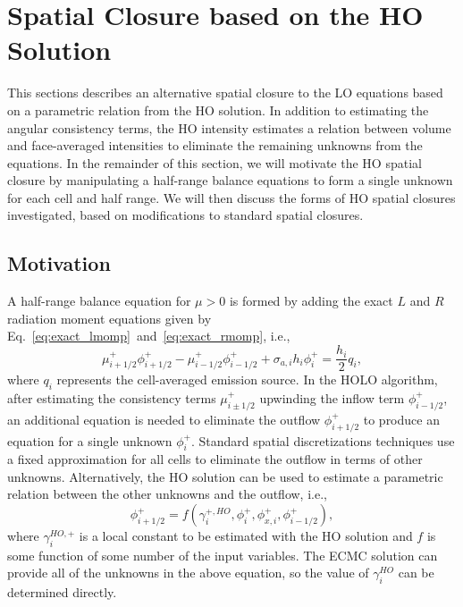 
\section{Spatial Closure based on the HO Solution}
\label{sec:spat_clos}

This sections describes an alternative spatial closure to the LO equations based on 
a parametric relation from the HO solution. In addition to estimating the angular
consistency terms, the HO intensity estimates a relation between volume and face-averaged
intensities to eliminate the remaining unknowns from the equations.  In the remainder of
this section, we will motivate the HO spatial closure by manipulating a half-range balance
equations to form a single unknown for each cell and half range.  We will then discuss
the forms of HO spatial closures investigated, based on modifications to standard spatial closures.

\subsection{Motivation}

A half-range balance equation for $\mu>0$ is formed by adding the
exact $L$ and
$R$ radiation moment equations given by
Eq.~\eqref{eq:exact_lmomp}~and~\eqref{eq:exact_rmomp}, i.e.,
\begin{equation}\label{eq:hr_bal}
    \mu^+_{i+1/2}\phi_{i+1/2}^+ - \mu^+_{i-1/2}\phi_{i-1/2}^+ +
    {\sigma_{a,i}h_i} \phi_i^+ = \frac{h_i}{2} q_i,
\end{equation}
where $q_i$ represents the cell-averaged emission source.  In the HOLO algorithm, after
estimating the consistency terms $\mu_{i\pm1/2}^+$ upwinding the inflow term
$\phi_{i-1/2}^+$, an additional equation is needed to eliminate the outflow $\phi_{i+1/2}^+$ to produce an
equation for a single unknown $\phi_{i}^+$.  Standard spatial discretizations techniques
use a fixed approximation for all cells to eliminate the outflow in terms of other
unknowns.  Alternatively, the HO solution can be used to estimate a parametric relation
between the other unknowns and the outflow, i.e.,
\begin{equation}\label{eq:ho_clos}
    \phi_{i+1/2}^+ = f(\gamma^{+,HO}_i, \phi_i^+, \phi_{x,i}^+, \phi_{i-1/2}^+),
\end{equation}
where $\gamma^{HO,+}_i$ is a local constant to be estimated with the HO solution and $f$ is some
function of some number of the input
variables.  The ECMC solution can provide all of the unknowns in the above equation, so
the value of $\gamma^{HO}_i$ can be determined directly. 

